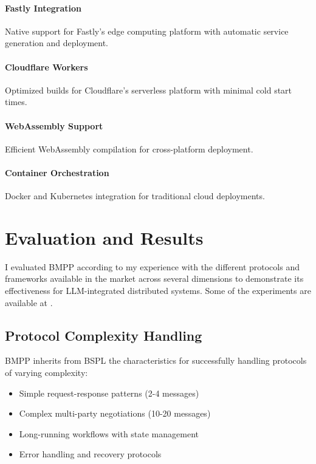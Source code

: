 \documentclass[11pt,a4paper]{article}
\begin{document}
	\paragraph{Fastly Integration} Native support for Fastly's edge computing platform with automatic service generation and deployment.
	
	\paragraph{Cloudflare Workers} Optimized builds for Cloudflare's serverless platform with minimal cold start times.
	
	\paragraph{WebAssembly Support} Efficient WebAssembly compilation for cross-platform deployment.
	
	\paragraph{Container Orchestration} Docker and Kubernetes integration for traditional cloud deployments.
	
	\section{Evaluation and Results}
	\label{sec:evaluation}
	
	I evaluated BMPP according to my experience with the different protocols and frameworks available in the market across several dimensions to demonstrate its effectiveness for LLM-integrated distributed systems. Some of the experiments are available at \cite{lmm-agents-features}.
	
	\subsection{Protocol Complexity Handling}
	\label{subsec:complexity}
	
	BMPP inherits from BSPL the characteristics for successfully handling protocols of varying complexity:
	\begin{itemize}
		\item Simple request-response patterns (2-4 messages)
		\item Complex multi-party negotiations (10-20 messages)
		\item Long-running workflows with state management
		\item Error handling and recovery protocols
	\end{itemize}
	
\end{document}
